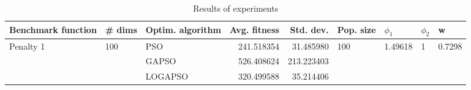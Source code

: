 \begin{table}
\centering
\caption{Results of experiments}
\begin{tabular}{lllrrllll}
\toprule
        Benchmark function &              \# dims & Optim. algorithm &  Avg. fitness &  Std. dev. &            Pop. size &               $\phi_{1}$ &         $\phi_{2}$ &                       w \\
\midrule
\multirow{3}{*}{Penalty 1} & \multirow{3}{*}{100} &              PSO &    241.518354 &  31.485980 & \multirow{3}{*}{100} & \multirow{3}{*}{1.49618} & \multirow{3}{*}{1} & \multirow{3}{*}{0.7298} \\
                           &                      &            GAPSO &    526.408624 & 213.223403 &                      &                          &                    &                         \\
                           &                      &          LOGAPSO &    320.499588 &  35.214406 &                      &                          &                    &                         \\
\bottomrule
\end{tabular}
\end{table}
